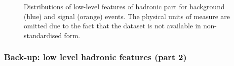 \documentclass[xcolor=table,8pt]{beamer}
\begin{document}
\begin{frame}[t]
\begin{figure}[!h]
\begin{minipage}[c]{0.25\linewidth}
{                    \label{fig:appendix_low_features_hadronic_j2_btag}
                }
            \end{minipage}%
            \caption{Distributions of low-level features of hadronic part for background (blue) and signal (orange) events. The physical units of measure are omitted due to the fact that the dataset is not available in non-standardised form.}
            \label{fig:appendix_low_features_hadronic_part1}
        \end{figure}
    \end{frame}
    
    
    \begin{frame}[t]
        \frametitle{Back-up: low level hadronic features (part 2)}
    
        \begin{figure}[!h]
            \begin{minipage}[c]{0.25\linewidth}
                \vspace{0pt}
                \centering
            \end{minipage}%
            \begin{minipage}[c]{0.25\linewidth}
                \vspace{0pt}
                \centering
\end{minipage}
\end{figure}
\end{frame}
\end{document}
